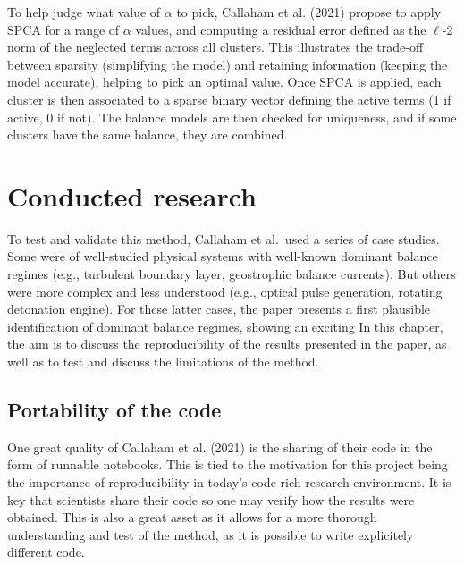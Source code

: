\documentclass[12pt]{report} %
\begin{document}
To help judge what value of $\alpha$ to pick, Callaham et al. (2021) propose to apply SPCA for a range of $\alpha$ values, and computing a residual error defined as the $\ell$-2 norm of the neglected terms across all clusters. This illustrates the trade-off between sparsity (simplifying the model) and retaining information (keeping the model accurate), helping to pick an optimal value. Once SPCA is applied, each cluster is then associated to a sparse binary vector defining the active terms (1 if active, 0 if not). The balance models are then checked for uniqueness, and if some clusters have the same balance, they are combined.


\chapter{Conducted research}

To test and validate this method, Callaham et al.\ used a series of case studies\cite{callaham2021learning}. Some were of well-studied physical systems with well-known dominant balance regimes (e.g., turbulent boundary layer, geostrophic balance currents). But others were more complex and less understood (e.g., optical pulse generation, rotating detonation engine). For these latter cases, the paper presents a first plausible identification of dominant balance regimes, showing an exciting  In this chapter, the aim is to discuss the reproducibility of the results presented in the paper, as well as to test and discuss the limitations of the method.

\section{Portability of the code}

One great quality of Callaham et al. (2021)\cite{callaham2021learning} is the sharing of their code in the form of runnable notebooks. This is tied to the motivation for this project being the importance of reproducibility in today’s code-rich research environment. It is key that scientists share their code so one may verify how the results were obtained. This is also a great asset as it allows for a more thorough understanding and test of the method, as it is possible to write explicitely different code.
\end{document}
